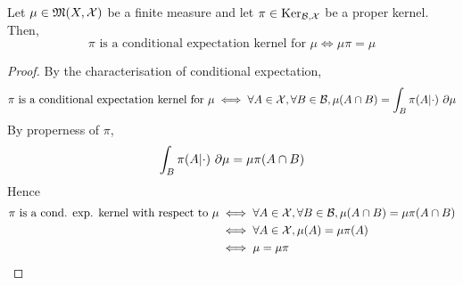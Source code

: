 \begin{lemma}
    \label{lem:cond-exp-proper-ker-bind}
    \leanok

    Let $\mu\in\mathfrak{M}(X,\mathcal X)$ be a finite measure and let $\pi\in\text{Ker}_{\mathcal B,\mathcal X}$ be a proper kernel. Then,
    $$\pi \text{ is a conditional expectation kernel for }\mu \iff \mu\pi = \mu$$
\end{lemma}
\begin{proof}
    \leanok

    By the characterisation of conditional expectation,
    $$\pi \text{ is a conditional expectation kernel for }\mu \iff \forall A \in \mathcal X, \forall B \in \mathcal B, \mu(A \cap B) = \int_B \pi(A|\cdot)\ \partial\mu$$
    By properness of $\pi$,
    $$\int_B \pi(A|\cdot)\ \partial\mu = \mu\pi(A \cap B)$$
    Hence
    \begin{align}
        \pi \text{ is a cond. exp. kernel with respect to }\mu
        & \iff \forall A \in \mathcal X, \forall B \in \mathcal B, \mu(A \cap B) = \mu\pi(A \cap B) \\
        & \iff \forall A \in \mathcal X, \mu(A) = \mu\pi(A) \\
        & \iff \mu = \mu\pi
    \end{align}
\end{proof}
